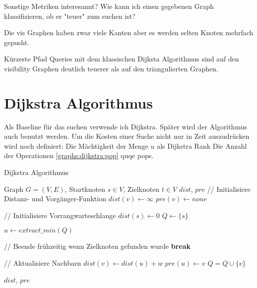 Sonstige Metriken interesannt?
Wie kann ich einen gegebenen Graph klassifizieren, ob er "teuer" zum suchen ist?

Die vis Graphen haben zwar viele Kanten aber es werden selten Knoten mehrfach gepusht.

Kürzeste Pfad Queries mit dem klassischen Dijksta Algorithmus sind auf den visibility Graphen deutlich teuerer als auf den triangulierten Graphen.



\section{Dijkstra Algorithmus}

Als Baseline für das suchen verwende ich Dijkstra.
Später wird der Algorithmus auch benutzt werden.
Um die Kosten einer Suche nicht nur in Zeit auszudrücken wird noch definiert:
Die Mächtigkeit der Menge $u$ als Dijkstra Rank
Die Anzahl der Operationen \ref{graphs:dijkstra:pop} quqe pops.



\begin{algorithm}
    \caption{Dijkstra Algorithmus}
    \begin{algorithmic}[1]
        \Require Graph $G = (V, E)$, Startknoten $s \in V$, Zielknoten $t \in V$
        \Ensure ${dist}$, ${pre}$
        \State // Initialisiere Distanz- und Vorgänger-Funktion
        \State ${dist}(v) \leftarrow \infty$
        \State ${pre}(v) \leftarrow {none}$
        \EndFor


        \State
        \State // Initialisiere Vorrangwarteschlange
        \State ${dist}(s) \leftarrow 0$
        \State $Q\leftarrow \{ s \}$

        \State
        \State $u \leftarrow{extract\_min}(Q)$\label{graphs:dijkstra:pop}

        \State
        \State // Beende frühzeitig wenn Zielknoten gefunden wurde
        \State \textbf{break}
        \EndIf

        \State
        \State // Aktualisiere Nachbarn
        \State ${dist}(v) \leftarrow {dist}(u) + w$
        \State ${pre}(u) \leftarrow v$
        \State $Q = Q \cup \{ v \}$
        \EndIf
        \EndFor

        \EndWhile

        \State
        \State \Return ${dist}$, ${pre}$
    \end{algorithmic}
\end{algorithm}


